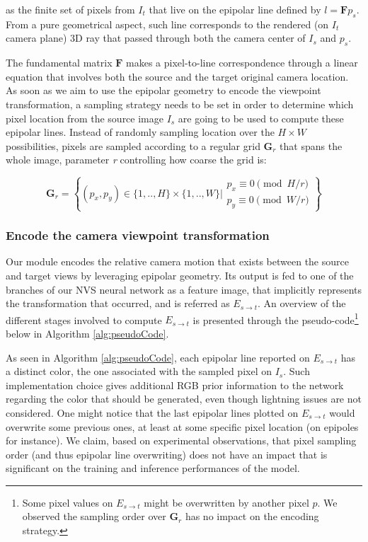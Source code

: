 as the finite set of pixels from $I_{t}$ that live on the epipolar line defined by $l=\mathbf{F}p_{s}$. From a pure geometrical aspect, such line corresponds to the rendered (on $I_{t}$ camera plane) 3D ray that passed through both the camera center of $I_{s}$ and $p_{s}$. 

The fundamental matrix $\mathbf{F}$ makes a pixel-to-line correspondence through a linear equation that involves both the source and the target original camera location. As soon as we aim to use the epipolar geometry to encode the viewpoint transformation, a sampling strategy needs to be set in order to determine which pixel location from the source image $I_{s}$ are going to be used to compute these epipolar lines. Instead of randomly sampling location over the $H\times W$ possibilities, pixels are sampled according to a regular grid $\textbf{G}_{r}$ that spans the whole image, parameter \textit{r} controlling how coarse the grid is: 

\begin{equation}
    \mathbf{G}_{r} = \left\{(p_{x},p_{y}) \in \{1,..,H\}\times \{1,..,W\} \Big\rvert \begin{array}{l}
                    p_x \equiv 0 \pmod{H/r}\\
             p_y \equiv 0 \pmod{W/r}
              \end{array}\right\}
\end{equation}


\subsubsection{Encode the camera viewpoint transformation}

Our module encodes the relative camera motion that exists between the source and target views by leveraging epipolar geometry. Its output is fed to one of the branches of our NVS neural network as a feature image, that implicitly represents the transformation that occurred, and is referred as $E_{s\xrightarrow{}t}$.
An overview of the different stages involved to compute $E_{s\xrightarrow{}t}$ is presented through the pseudo-code\footnote{Some pixel values on $E_{s\xrightarrow{}t}$ might be overwritten by another pixel $p$. We observed the sampling order over $\mathbf{G}_{r}$ has no impact on the encoding strategy.} below in Algorithm \ref{alg:pseudoCode}. \newline

As seen in Algorithm \ref{alg:pseudoCode}, each epipolar line reported on $E_{s\xrightarrow{}t}$ has a distinct color, the one associated with the sampled pixel on $I_s$. Such implementation choice gives additional RGB prior information to the network regarding the color that should be generated, even though lightning issues are not considered. One might notice that the last epipolar lines plotted on $E_{s\xrightarrow{}t}$ would overwrite some previous ones, at least at some specific pixel location (on epipoles for instance). We claim, based on experimental observations, that pixel sampling order (and thus epipolar line overwriting) does not have an impact that is significant on the training and inference performances of the model. 

